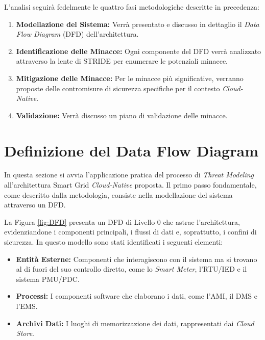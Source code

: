 L'analisi seguirà fedelmente le quattro fasi metodologiche descritte in precedenza:

\begin{enumerate}
    \item \textbf{Modellazione del Sistema:} Verrà presentato e discusso in dettaglio il \textit{Data Flow Diagram} (DFD) dell'architettura.
    \item \textbf{Identificazione delle Minacce:} Ogni componente del DFD verrà analizzato attraverso la lente di STRIDE per enumerare le potenziali minacce.
    \item \textbf{Mitigazione delle Minacce:} Per le minacce più significative, verranno proposte delle contromisure di sicurezza specifiche per il contesto \textit{Cloud-Native}.
    \item \textbf{Validazione:} Verrà discusso un piano di validazione delle minacce.
\end{enumerate}


\section{Definizione del Data Flow Diagram}

In questa sezione si avvia l'applicazione pratica del processo di \textit{Threat Modeling} all'architettura Smart Grid \textit{Cloud-Native} proposta. Il primo passo fondamentale, come descritto dalla metodologia, consiste nella modellazione del sistema attraverso un DFD.

La  Figura \ref{fig:DFD} presenta un DFD di Livello 0 che astrae l'architettura, evidenziandone i componenti principali, i flussi di dati e, soprattutto, i confini di sicurezza. In questo modello sono stati identificati i seguenti elementi:

\begin{itemize}
    \item \textbf{Entità Esterne:} Componenti che interagiscono con il sistema ma si trovano al di fuori del suo controllo diretto, come lo \textit{Smart Meter}, l'RTU/IED e il sistema PMU/PDC.
    \item \textbf{Processi:} I componenti software che elaborano i dati, come l'AMI, il DMS e l'EMS.
    \item \textbf{Archivi Dati:} I luoghi di memorizzazione dei dati, rappresentati dai \textit{Cloud Store}.
\end{itemize}

